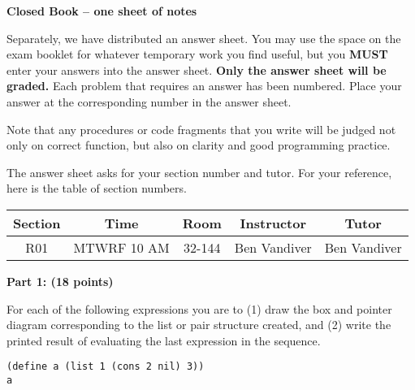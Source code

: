 
\def\fbox#1{%
  \vtop{\vbox{\hrule%
              \hbox{\vrule\kern3pt%
                    \vtop{\vbox{\kern3pt#1}\kern3pt}%
                    \kern3pt\vrule}}%
        \hrule}}

\def\emptybox#1#2{\fbox{\vbox to #2{\hbox to #1 {\null}}}}




\centerline{\bf Closed Book -- one sheet of notes}

\vskip 10pt

Separately, we have distributed an answer sheet.  You may use the
space on the exam booklet for whatever temporary work you find useful,
but you {\bf MUST} enter your answers into the answer sheet.  {\bf
Only the answer sheet will be graded.}  Each problem that requires an answer has
been numbered.  Place your answer at the corresponding number in the
answer sheet.

Note that any procedures or code fragments that you write will be
judged not only on correct function, but also on clarity and good
programming practice.

The answer sheet asks for your section number and tutor.  For your
reference, here is the table of section numbers.

\vskip 0.25in

\begin{center}
\begin{tabular}{|c|c|c||c|c|}
\hline
Section & Time &        Room &  Instructor &    Tutor \\ \hline
R01 & MTWRF 10 AM &   32-144 & Ben Vandiver & Ben Vandiver \\ \hline
\end{tabular}
\end{center}

\newpage
{\bf Part 1: (18 points)}

For each of the following expressions you are to (1) draw the box and pointer
diagram corresponding to the list or pair structure created, and (2) write the
printed result of evaluating the last expression in the sequence.

\medskip

{\small \begin{verbatim}
(define a (list 1 (cons 2 nil) 3))
a
\end{verbatim}}
\vspace*{-0.1in}

